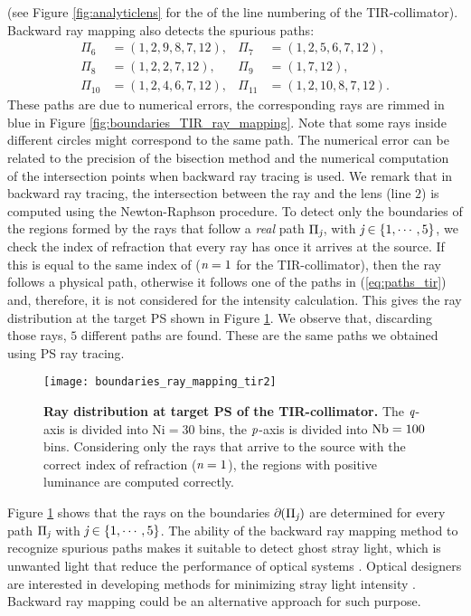 (see Figure \ref{fig:analyticlens} for the of the line numbering of the TIR-collimator). 
Backward ray mapping also detects the spurious paths:
\begin{equation}\label{eq:paths_tir}
\begin{array}{llll}
\Pi_6&=(1,2,9,8,7,12), & \Pi_7&=(1,2,5,6,7,12), \\
\Pi_8&=(1,2,2,7,12),& \Pi_9&=(1,7,12),\\
\Pi_{10}&=(1,2,4,6,7,12),& \Pi_{11}&=(1,2,10,8,7,12).
\end{array}\end{equation}
These paths are due to numerical errors, the corresponding rays are rimmed in blue in Figure \ref{fig:boundaries_TIR_ray_mapping}. Note that some rays inside different circles might correspond to the same path. The numerical error can be related to the precision of the bisection method and the numerical computation of the intersection points when backward ray tracing is used. We remark that in backward ray tracing, the intersection between the ray and the lens (line $2$) is computed using the Newton-Raphson procedure.
To detect only the boundaries of the regions formed by the rays that follow a \textit{real} path $\Pi_{\textit{j}}$, with $\textit{j}\in\{1, \cdots, 5\}$, we check the index of refraction that every ray has once it arrives at the source.
If this is equal to the same index of  ($\textit{n}=1$ for the TIR-collimator), then the ray follows a physical path, otherwise it follows one of the paths in (\ref{eq:paths_tir}) and, therefore, it is not considered for the intensity calculation. This gives the ray distribution at the target PS shown in Figure \ref{fig:boundaries_TIR_ray_mapping1}. We observe that, discarding those rays, $5$ different paths are found. These are the same paths we obtained using PS ray tracing.
\begin{figure}[h]
  \begin{center}
  \texttt{[image: boundaries\_ray\_mapping\_tir2]}
  \end{center}
  \caption{\textbf{Ray distribution at target PS of the TIR-collimator.}
 The $\textit{q}$-axis is divided into $\textrm{Ni}=30$ bins, the $\textit{p}$-axis is divided into $\textrm{Nb} = 100$ bins. Considering only the rays that arrive to the source with the correct index of refraction ($\textit{n}=1$), the regions with positive luminance are computed correctly.}
\label{fig:boundaries_TIR_ray_mapping1}
 \end{figure}
Figure \ref{fig:boundaries_TIR_ray_mapping1} shows that the rays on the boundaries $\partial$$(\Pi_{\textit{j}})$ are determined for every path $\Pi_{\textit{j}}$ with $\textit{j}\in\{1, \cdots, 5\}$. The ability of the backward ray mapping method to recognize spurious paths makes it suitable to detect ghost stray light, which is unwanted light that reduce the performance of optical systems \cite{breault1995control}. Optical designers are interested in developing methods for minimizing stray light intensity \cite{grabarnik2015optical}. Backward ray mapping could be an alternative approach for such purpose. 

